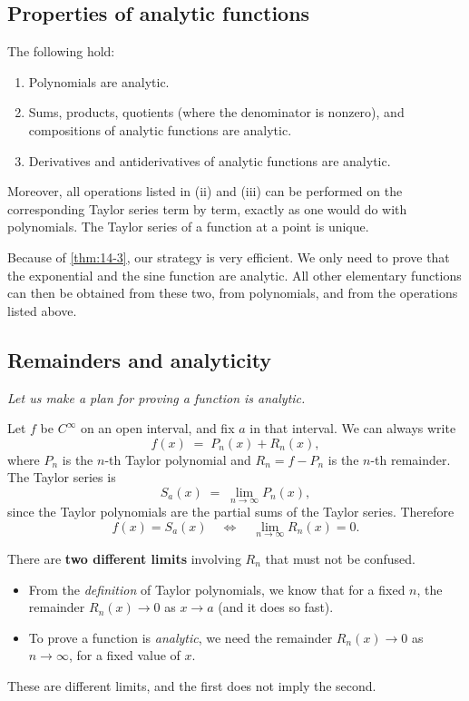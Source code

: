 \subsection*{Properties of analytic functions}

\begin{theorem}
\label{thm:14-3}
The following hold:
\begin{enumerate}[label=(\roman*)]
  \item Polynomials are analytic.
  \item Sums, products, quotients (where the denominator is nonzero), and compositions of analytic functions are analytic.
  \item Derivatives and antiderivatives of analytic functions are analytic.
\end{enumerate}
Moreover, all operations listed in \textup{(ii)} and \textup{(iii)} can be performed on the corresponding Taylor series term by term, exactly as one would do with polynomials.  The Taylor series of a function at a point is unique.
\end{theorem}

\begin{remark}
Because of \cref{thm:14-3}, our strategy is very efficient.  We only need to prove that the exponential and the sine function are analytic.  All other elementary functions can then be obtained from these two, from polynomials, and from the operations listed above.
\end{remark}

\subsection*{Remainders and analyticity}

\textit{Let us make a plan for proving a function is analytic.}

Let $f$ be $C^{\infty}$ on an open interval, and fix $a$ in that interval.  We can always write
\[
  f(x) \;=\; P_{n}(x) + R_{n}(x),
\]
where $P_{n}$ is the $n$-th Taylor polynomial and $R_{n}=f-P_{n}$ is the $n$-th remainder.  The Taylor series is
\[
  S_{a}(x) \;=\; \lim_{n\to\infty}P_{n}(x),
\]
since the Taylor polynomials are the partial sums of the Taylor series.  Therefore
\[
  f(x)=S_{a}(x) \quad\Longleftrightarrow\quad \lim_{n\to\infty}R_{n}(x)=0.
\]

\begin{remark}[Warning]
There are \textbf{two different limits} involving $R_{n}$ that must not be confused.
\begin{itemize}
  \item From the \emph{definition} of Taylor polynomials, we know that for a fixed $n$, the remainder $R_{n}(x)\to 0$ as $x\to a$ (and it does so fast).
  \item To prove a function is \emph{analytic}, we need the remainder $R_{n}(x)\to 0$ as $n\to\infty$, for a fixed value of $x$.
\end{itemize}
These are different limits, and the first does not imply the second.
\end{remark}

